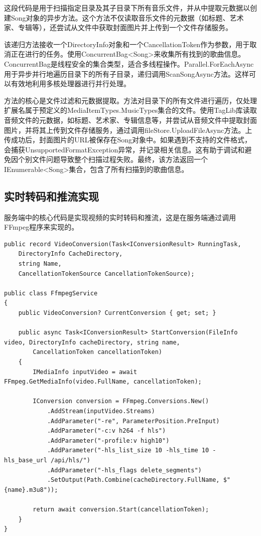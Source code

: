 \documentclass[main.tex]{subfiles}
\begin{document}
这段代码是用于扫描指定目录及其子目录下所有音乐文件，并从中提取元数据以创建Song对象的异步方法。这个方法不仅读取音乐文件的元数据（如标题、艺术家、专辑等），还尝试从文件中获取封面图片并上传到一个文件存储服务。

该递归方法接收一个DirectoryInfo对象和一个CancellationToken作为参数，用于取消正在进行的任务。使用ConcurrentBag<Song>来收集所有找到的歌曲信息。ConcurrentBag是线程安全的集合类型，适合多线程操作。Parallel.ForEachAsync用于异步并行地遍历目录下的所有子目录，递归调用ScanSongAsync方法。这样可以有效地利用多核处理器进行并行处理。

方法的核心是文件过滤和元数据提取。方法对目录下的所有文件进行遍历，仅处理扩展名属于预定义的MediaItemTypes.MusicTypes集合的文件。使用TagLib库读取音频文件的元数据，如标题、艺术家、专辑信息等，并尝试从音频文件中提取封面图片，并将其上传到文件存储服务，通过调用fileStore.UploadFileAsync方法。上传成功后，封面图片的URL被保存在Song对象中。如果遇到不支持的文件格式，会捕获UnsupportedFormatException异常，并记录相关信息。这有助于调试和避免因个别文件问题导致整个扫描过程失败。最终，该方法返回一个IEnumerable<Song>集合，包含了所有扫描到的歌曲信息。

\subsection{实时转码和推流实现}

服务端中的核心代码是实现视频的实时转码和推流，这是在服务端通过调用FFmpeg程序来实现的。

\begin{lstlisting}[style=csharp]
public record VideoConversion(Task<IConversionResult> RunningTask,
    DirectoryInfo CacheDirectory,
    string Name,
    CancellationTokenSource CancellationTokenSource);

public class FfmpegService
{
    public VideoConversion? CurrentConversion { get; set; }

    public async Task<IConversionResult> StartConversion(FileInfo video, DirectoryInfo cacheDirectory, string name,
        CancellationToken cancellationToken)
    {
        IMediaInfo inputVideo = await FFmpeg.GetMediaInfo(video.FullName, cancellationToken);

        IConversion conversion = FFmpeg.Conversions.New()
            .AddStream(inputVideo.Streams)
            .AddParameter("-re", ParameterPosition.PreInput)
            .AddParameter("-c:v h264 -f hls")
            .AddParameter("-profile:v high10")
            .AddParameter("-hls_list_size 10 -hls_time 10 -hls_base_url /api/hls/")
            .AddParameter("-hls_flags delete_segments")
            .SetOutput(Path.Combine(cacheDirectory.FullName, $"{name}.m3u8"));

        return await conversion.Start(cancellationToken);
    }
}
\end{lstlisting}
\end{document}
